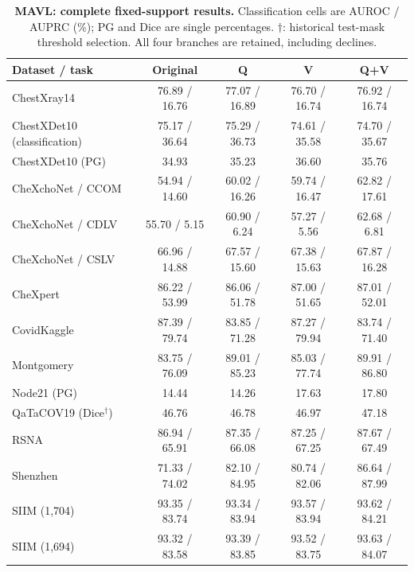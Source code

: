 \begin{table}[tp]
\centering
\caption{\textbf{MAVL: complete fixed-support results.} Classification cells are AUROC / AUPRC (\%); PG and Dice are single percentages. $\dagger$: historical test-mask threshold selection. All four branches are retained, including declines.}
\label{tab:supp-fixed-mavl}
\small
\setlength{\tabcolsep}{4pt}
\begin{tabular*}{\textwidth}{@{\extracolsep{\fill}}lcccc@{}}
\toprule
Dataset / task & Original & Q & V & Q+V \\
\midrule
ChestXray14 & 76.89 / 16.76 & 77.07 / 16.89 & 76.70 / 16.74 & 76.92 / 16.74 \\
ChestXDet10 (classification) & 75.17 / 36.64 & 75.29 / 36.73 & 74.61 / 35.58 & 74.70 / 35.67 \\
ChestXDet10 (PG) & 34.93 & 35.23 & 36.60 & 35.76 \\
CheXchoNet / CCOM & 54.94 / 14.60 & 60.02 / 16.26 & 59.74 / 16.47 & 62.82 / 17.61 \\
CheXchoNet / CDLV & 55.70 / 5.15 & 60.90 / 6.24 & 57.27 / 5.56 & 62.68 / 6.81 \\
CheXchoNet / CSLV & 66.96 / 14.88 & 67.57 / 15.60 & 67.38 / 15.63 & 67.87 / 16.28 \\
CheXpert & 86.22 / 53.99 & 86.06 / 51.78 & 87.00 / 51.65 & 87.01 / 52.01 \\
CovidKaggle & 87.39 / 79.74 & 83.85 / 71.28 & 87.27 / 79.94 & 83.74 / 71.40 \\
Montgomery & 83.75 / 76.09 & 89.01 / 85.23 & 85.03 / 77.74 & 89.91 / 86.80 \\
Node21 (PG) & 14.44 & 14.26 & 17.63 & 17.80 \\
QaTaCOV19 (Dice$^\dagger$) & 46.76 & 46.78 & 46.97 & 47.18 \\
RSNA & 86.94 / 65.91 & 87.35 / 66.08 & 87.25 / 67.25 & 87.67 / 67.49 \\
Shenzhen & 71.33 / 74.02 & 82.10 / 84.95 & 80.74 / 82.06 & 86.64 / 87.99 \\
SIIM (1,704) & 93.35 / 83.74 & 93.34 / 83.94 & 93.57 / 83.94 & 93.62 / 84.21 \\
SIIM (1,694) & 93.32 / 83.58 & 93.39 / 83.85 & 93.52 / 83.75 & 93.63 / 84.07 \\
\bottomrule
\end{tabular*}
\end{table}

